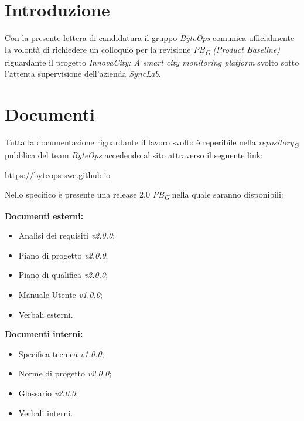 \documentclass{article}
\begin{document}
\flushleft

\section{Introduzione}
Con la presente lettera di candidatura il gruppo \textit{ByteOps} comunica ufficialmente la volontà di richiedere un colloquio per la revisione \textit{PB}\textsubscript{\textit{G}} \textit{(Product Baseline)} riguardante il progetto \textit{InnovaCity: A smart city monitoring platform} svolto sotto l'attenta supervisione dell'azienda \textit{SyncLab}.

\section{Documenti}
Tutta la documentazione riguardante il lavoro svolto è reperibile nella \textit{repository}\textsubscript{\textit{G}} pubblica del team \textit{ByteOps} accedendo al sito attraverso il seguente link:

\begin{center}
    \href{https://byteops-swe.github.io}{https://byteops-swe.github.io}
\end{center}

Nello specifico è presente una release 2.0 \textit{PB}\textsubscript{\textit{G}} nella quale saranno disponibili:
\vspace{0.2cm}

\textbf{Documenti esterni:}
\begin{itemize}
    \item Analisi dei requisiti \textit{v2.0.0};
    \item Piano di progetto \textit{v2.0.0};
    \item Piano di qualifica \textit{v2.0.0};
    \item Manuale Utente \textit{v1.0.0};
    \item Verbali esterni.
\end{itemize}
\vspace{0.2cm}

\textbf{Documenti interni:}
\begin{itemize}
    \item Specifica tecnica \textit{v1.0.0};
    \item Norme di progetto \textit{v2.0.0};
    \item Glossario \textit{v2.0.0};
    \item Verbali interni.
\end{itemize}
\end{document}
